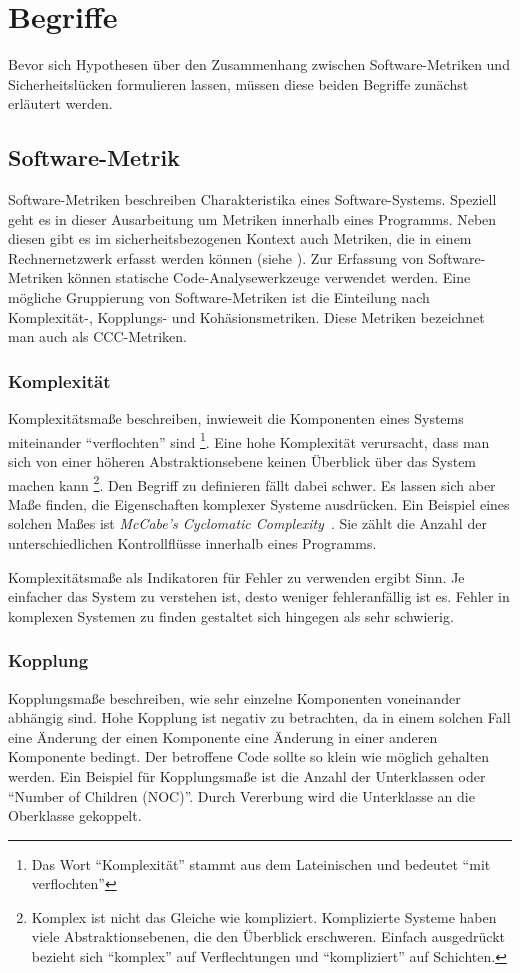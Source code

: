 \section{Begriffe}
\label{sec:begriffe}
Bevor sich Hypothesen über den Zusammenhang zwischen Software-Metriken und Sicherheitslücken formulieren lassen, müssen diese beiden Begriffe zunächst erläutert werden.

\subsection{Software-Metrik}
Software-Metriken beschreiben Charakteristika eines Software-Systems.
Speziell geht es in dieser Ausarbeitung um Metriken innerhalb eines Programms.
Neben diesen gibt es im sicherheitsbezogenen Kontext auch Metriken, die in einem Rechnernetzwerk erfasst werden können (siehe \cite{cheng2014}).
Zur Erfassung von Software-Metriken können statische Code-Analysewerkzeuge verwendet werden.
Eine mögliche Gruppierung von Software-Metriken ist die Einteilung nach Komplexität-, Kopplungs- und Kohäsionsmetriken.
Diese Metriken bezeichnet man auch als CCC-Metriken.

\subsubsection{Komplexität}
Komplexitätsmaße beschreiben, inwieweit die Komponenten eines Systems miteinander "`verflochten"' sind
\footnote{Das Wort "`Komplexität"' stammt aus dem Lateinischen und bedeutet "`mit verflochten"'}.
Eine hohe Komplexität verursacht, dass man sich von einer höheren Abstraktionsebene keinen Überblick über das System machen kann
\footnote{Komplex ist nicht das Gleiche wie kompliziert. Komplizierte Systeme haben viele Abstraktionsebenen, die den Überblick erschweren. Einfach ausgedrückt bezieht sich "`komplex"' auf Verflechtungen und "`kompliziert"' auf Schichten.}.
Den Begriff zu definieren fällt dabei schwer.
Es lassen sich aber Maße finden, die Eigenschaften komplexer Systeme ausdrücken.
Ein Beispiel eines solchen Maßes ist \textit{McCabe's Cyclomatic Complexity}~\cite{mccabe1976}.
Sie zählt die Anzahl der unterschiedlichen Kontrollflüsse innerhalb eines Programms.

Komplexitätsmaße als Indikatoren für Fehler zu verwenden ergibt Sinn.
Je einfacher das System zu verstehen ist, desto weniger fehleranfällig ist es.
Fehler in komplexen Systemen zu finden gestaltet sich hingegen als sehr schwierig.

\subsubsection{Kopplung}
Kopplungsmaße beschreiben, wie sehr einzelne Komponenten voneinander abhängig sind.
Hohe Kopplung ist negativ zu betrachten, da in einem solchen Fall eine Änderung der einen Komponente eine Änderung in einer anderen Komponente bedingt.
Der betroffene Code sollte so klein wie möglich gehalten werden.
Ein Beispiel für Kopplungsmaße ist die Anzahl der Unterklassen oder "`Number of Children (NOC)"'.
Durch Vererbung wird die Unterklasse an die Oberklasse gekoppelt.

